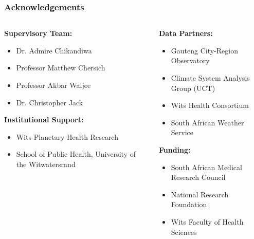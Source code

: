 \documentclass[aspectratio=169]{beamer}
\begin{document}
\begin{frame}
    \frametitle{Acknowledgements}
    
    \begin{columns}[T]
        \begin{column}{0.48\textwidth}
            \textbf{\large Supervisory Team:}
            \begin{itemize}[leftmargin=*, itemsep=6pt]
                \item Dr. Admire Chikandiwa
                \item Professor Matthew Chersich
                \item Professor Akbar Waljee
                \item Dr. Christopher Jack
            \end{itemize}
            
            \textbf{\large Institutional Support:}
            \begin{itemize}[leftmargin=*, itemsep=6pt]
                \item Wits Planetary Health Research
                \item School of Public Health, University of the Witwatersrand
            \end{itemize}
        \end{column}
        \begin{column}{0.48\textwidth}
            \textbf{\large Data Partners:}
            \begin{itemize}[leftmargin=*, itemsep=6pt]
                \item Gauteng City-Region Observatory
                \item Climate System Analysis Group (UCT)
                \item Wits Health Consortium
                \item South African Weather Service
            \end{itemize}
            
            \textbf{\large Funding:}
            \begin{itemize}[leftmargin=*, itemsep=6pt]
                \item South African Medical Research Council
                \item National Research Foundation
                \item Wits Faculty of Health Sciences
            \end{itemize}
        \end{column}
    \end{columns}
\end{frame}
\end{document}
